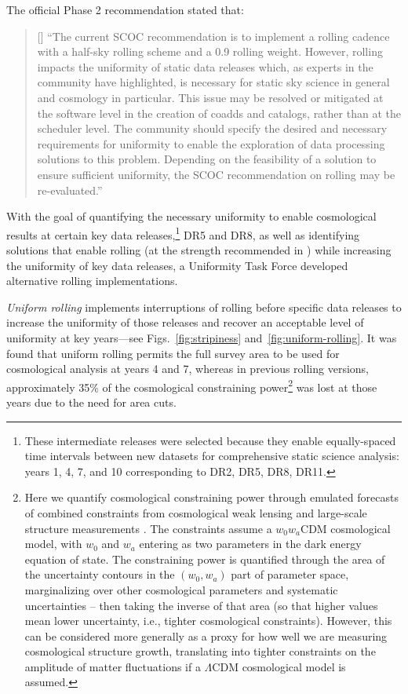 The official Phase 2 recommendation stated that:
\vspace{-0.5cm}
\begin{quote}
     [] ``The current SCOC recommendation is to implement a rolling cadence with a half-sky rolling scheme and a 0.9 rolling weight. However, rolling impacts the uniformity of static data releases which, as experts in the community have highlighted, is necessary for static sky science in general and cosmology in particular. This issue may be resolved or mitigated at the software level in the creation of coadds and catalogs, rather than at the scheduler level. The community should specify the desired and necessary requirements for uniformity to enable the exploration of data processing solutions to this problem. Depending on the feasibility of a solution to ensure sufficient uniformity, the SCOC recommendation on rolling may be re-evaluated.'' 

 \end{quote}

 With the goal of quantifying the necessary uniformity to enable cosmological results at certain key data releases,\footnote{These intermediate releases were selected because they enable equally-spaced time intervals between new datasets for comprehensive static science analysis: years 1, 4, 7, and 10 corresponding to DR2, DR5, DR8, DR11.} DR5 and DR8, as well as identifying solutions that enable rolling (at the strength recommended in ) while increasing the uniformity of key data releases, a Uniformity Task Force developed alternative rolling implementations. 
 
 {\it Uniform rolling} implements interruptions of rolling before specific data releases to increase the uniformity of those releases and recover an acceptable level of uniformity at key years---see Figs.~\ref{fig:stripiness} and~\ref{fig:uniform-rolling}.  It was found that uniform rolling permits the full survey area to be used for cosmological analysis at years 4 and 7, whereas in previous rolling versions, approximately 35\% of the cosmological constraining power\footnote{Here we quantify cosmological constraining power through emulated forecasts of combined constraints from cosmological weak lensing and large-scale structure measurements \citep{2022ApJS..259...58L}.  The constraints assume a $w_0 w_a$CDM cosmological model, with $w_0$ and $w_a$ entering as two parameters in the dark energy equation of state.  The constraining power is quantified through the area of the uncertainty contours in the $(w_0, w_a)$ part of parameter space, marginalizing over other cosmological parameters and systematic uncertainties -- then taking the inverse of that area (so that higher values mean lower uncertainty, i.e., tighter cosmological constraints).  However, this can be considered more generally as a proxy for how well we are measuring cosmological structure growth, translating into tighter constraints on the amplitude of matter fluctuations if a $\Lambda$CDM cosmological model is assumed.} was lost at those years due to the need for area cuts. 

